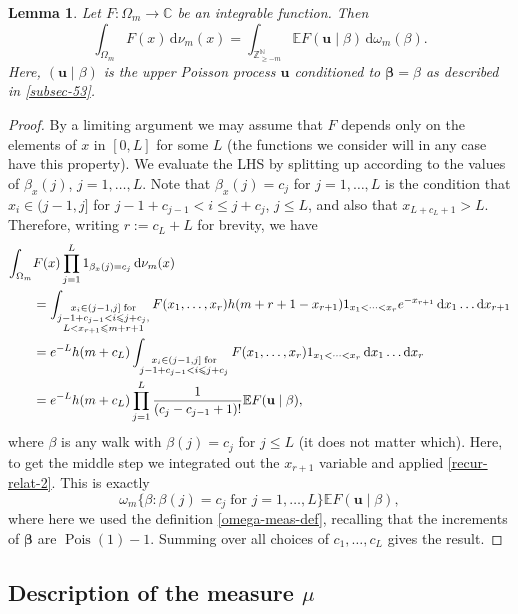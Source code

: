 \documentclass[11pt,reqno]{amsart}
\numberwithin{equation}{section}
\newtheorem{lemma}[theorem]{Lemma}
\theoremstyle{definition}
\theoremstyle{remark}
\newcommand{\mb}{\mathbb}
\newcommand{\mbf}{\mathbf}
\newcommand\Pois{\operatorname{Pois}}
\def\boldbeta{\boldsymbol\beta}
\renewcommand{\le}{\leqslant}
\renewcommand{\ge}{\geqslant}
\newcommand\Z{\mathbb{Z}}
\newcommand\C{\mathbb{C}}
\newcommand\N{\mathbb{N}}
\begin{document}
\begin{lemma}\label{lem125} Let $F : \Omega_m \rightarrow \C$ be an integrable function. Then
\[ \int_{\Omega_m} F(x) \, \mathrm{d}\nu_m(x) = \int_{\Z^{\N}_{\ge -m}} \mb{E} F(\mbf{u} \mid \beta) \, \mathrm{d}\omega_m(\beta).\] Here, $(\mbf{u} \mid \beta)$ is the upper Poisson process $\mbf{u}$ conditioned to $\boldbeta = \beta$ as described in \cref{subsec-53}.
\end{lemma}
\begin{proof} By a limiting argument we may assume that $F$ depends only on the elements of $x$ in $[0,L]$ for some $L$ (the functions we consider will in any case have this property). We evaluate the LHS by splitting up according to the values of $\beta_{x}(j)$, $j = 1,\dots, L$. Note that $\beta_{x}(j)= c_j$ for $j = 1,\dots, L$ is the condition that $x_{i} \in (j-1, j]$ for $j-1 + c_{j-1} < i \le j + c_j$, $j \le L$, and also that $x_{L + c_L + 1} > L$. Therefore, writing $r := c_L + L$ for brevity, we have
\begin{align*} \int_{\Omega_m} & F(x) \prod_{j = 1}^L 1_{\beta_{x}(j) = c_j} \, \mathrm{d}\nu_m(x) \\ & =  \int_{\substack{x_i \in (j-1,j] \; \mbox{\scriptsize for} \\ j - 1 + c_{j-1} < i \le j + c_j ,\\ L < x_{r+1} \le m + r + 1}} F(x_1,\dots, x_{r})  h(m + r + 1 - x_{r + 1}) 1_{x_1 < \dots < x_r} e^{-x_{r + 1}} \, \mathrm{d}x_1 \dots \mathrm{d}x_{r+1}\\ &  = e^{-L} h(m + c_L )\int_{\substack{x_i \in (j-1,j] \; \mbox{\scriptsize for} \\ j - 1 + c_{j-1} < i \le j + c_j } } F(x_1,\dots, x_{r}) 1_{x_1 < \dots < x_r} \, \mathrm{d}x_1 \dots \mathrm{d}x_{r} \\ & = e^{-L} h(m + c_L ) \prod_{j = 1}^L \frac{1}{(c_j - c_{j-1} + 1)!} \mb{E}F(\mbf{u} \mid \beta),\end{align*} where $\beta$ is any walk with $\beta(j) = c_j$ for $j \le L$ (it does not matter which). Here, to get the middle step we integrated out the $x_{r+1}$ variable and applied \cref{recur-relat-2}. This is exactly \[\omega_m\{ \beta : \beta(j) = c_j \; \mbox{for $j = 1,\dots, L$}\} \mb{E}F(\mbf{u} \mid \beta),\]  where here we used the definition \cref{omega-meas-def}, recalling that the increments of $\boldbeta$ are $\Pois(1) - 1$. Summing over all choices of $c_1,\dots, c_L$ gives the result.
\end{proof}


\subsection{Description of the measure $\mu$} 
\end{document}
